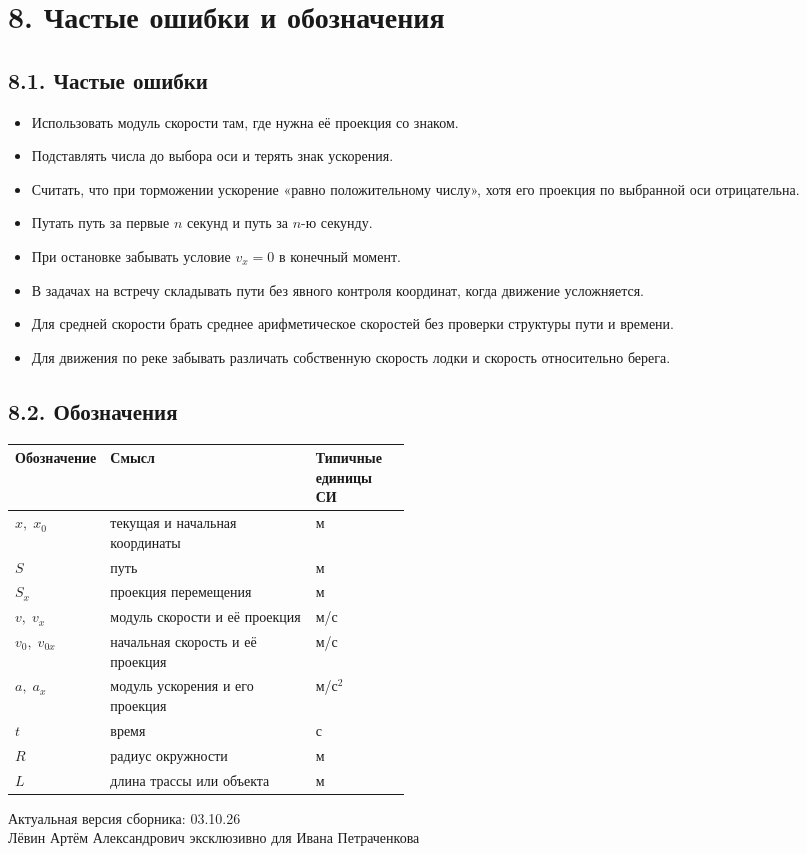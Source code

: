 \documentclass[a4paper,12pt]{article}
\newcommand{\headcell}[1]{\textbf{\color{darkaccent}#1}}
\begin{document}
\normalsize
\clearpage

\section*{8. Частые ошибки и обозначения}
\small

\subsection*{8.1. Частые ошибки}
\begin{itemize}
\item Использовать модуль скорости там, где нужна её проекция со знаком.
\item Подставлять числа до выбора оси и терять знак ускорения.
\item Считать, что при торможении ускорение «равно положительному числу», хотя его проекция по выбранной оси отрицательна.
\item Путать путь за первые $n$ секунд и путь за $n$-ю секунду.
\item При остановке забывать условие $v_x=0$ в конечный момент.
\item В задачах на встречу складывать пути без явного контроля координат, когда движение усложняется.
\item Для средней скорости брать среднее арифметическое скоростей без проверки структуры пути и времени.
\item Для движения по реке забывать различать собственную скорость лодки и скорость относительно берега.
\end{itemize}

\subsection*{8.2. Обозначения}
\begin{center}
\renewcommand{\arraystretch}{1.3}
\begin{tabularx}{0.92\linewidth}{@{}p{0.22\linewidth}Y p{0.24\linewidth}@{}}
\toprule
\headcell{Обозначение} & \headcell{Смысл} & \headcell{Типичные единицы СИ} \\
\midrule
$x,\;x_0$ & текущая и начальная координаты & м \\
$S$ & путь & м \\
$S_x$ & проекция перемещения & м \\
$v,\;v_x$ & модуль скорости и её проекция & м/с \\
$v_0,\;v_{0x}$ & начальная скорость и её проекция & м/с \\
$a,\;a_x$ & модуль ускорения и его проекция & м/с$^2$ \\
$t$ & время & с \\
$R$ & радиус окружности & м \\
$L$ & длина трассы или объекта & м \\
\bottomrule
\end{tabularx}
\end{center}

\vfill
\begin{center}
\color{textgray}\small
Актуальная версия сборника: 03.10.26\\[2mm]
Лёвин Артём Александрович эксклюзивно для Ивана Петраченкова
\end{center}
\end{document}
